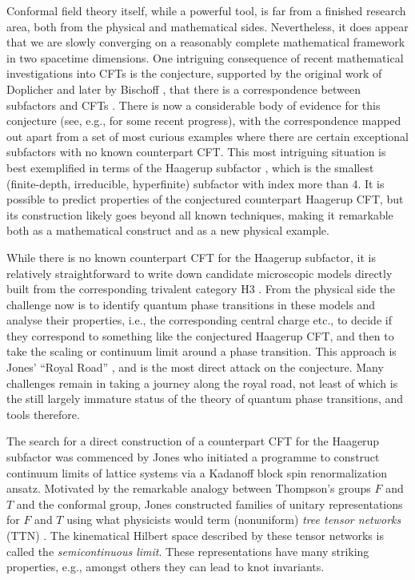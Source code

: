 \documentclass[11pt,oneside]{amsart}
\theoremstyle{plain}%
\theoremstyle{definition}
\theoremstyle{remark}
\begin{document}
Conformal field theory itself, while a powerful tool, is far from a finished research area, both from the physical and mathematical sides. Nevertheless, it does appear that we are slowly converging on a reasonably complete mathematical framework in two spacetime dimensions. One intriguing consequence of recent mathematical investigations into CFTs is the conjecture, supported by the original work of Doplicher \cite{doplicherNewDualityTheory1989} and later by Bischoff \cites{bischoffRelationSubfactorsArising2015,bischoffRemarkCFTRealization2016}, that there is a correspondence between subfactors and CFTs \cite{Jones2010VonNA}. There is now a considerable body of evidence for this conjecture (see, e.g., \cites{xuExamplesSubfactorsConformal2018,calegariCyclotomicIntegersFusion2011} for some recent progress), with the correspondence mapped out apart from a set of most curious examples where there are certain exceptional subfactors with no known counterpart CFT. This most intriguing situation is best exemplified in terms of the Haagerup subfactor \cites{haagerupPrincipal1993,asaeda_exotic_1999}, which is the smallest (finite-depth, irreducible, hyperfinite) subfactor with index more than 4. It is possible to predict \cite{evansExoticnessRealisabilityTwisted2011} properties of the conjectured counterpart Haagerup CFT, but its construction likely goes beyond all known techniques, making it remarkable both as a mathematical construct and as a new physical example.

While there is no known counterpart CFT for the Haagerup subfactor, it is relatively straightforward to write down candidate microscopic models directly built from the corresponding trivalent category H3 \cite{morrison_categories_2015}. From the physical side the challenge now is to identify quantum phase transitions in these models and analyse their properties, i.e., the corresponding central charge etc., to decide if they correspond to something like the conjectured Haagerup CFT, and then to take the scaling or continuum limit around a phase transition. This approach is Jones' ``Royal Road'' \cite{jones_unitary_2014}, and is the most direct attack on the conjecture. Many challenges remain in taking a journey along the royal road, not least of which is the still largely immature status of the theory of quantum phase transitions, and tools therefore.

The search for a direct construction of a counterpart CFT for the Haagerup subfactor was commenced by Jones who initiated a programme \cites{jones_unitary_2014,jones_scale_2017,jones_no-go_2016} to construct continuum limits of lattice systems via a Kadanoff block spin renormalization ansatz. Motivated by the remarkable analogy between Thompson's groups $F$ and $T$ \cite{cannon_introductory_1996} and the conformal group, Jones constructed families of unitary representations for $F$ and $T$ using what physicists would term (nonuniform) \emph{tree tensor networks} (TTN) \cite{bridgeman_hand-waving_2016}. The kinematical Hilbert space described by these tensor networks is called the \emph{semicontinuous limit}. These representations have many striking properties, e.g., amongst others they can lead to knot invariants.
\end{document}
